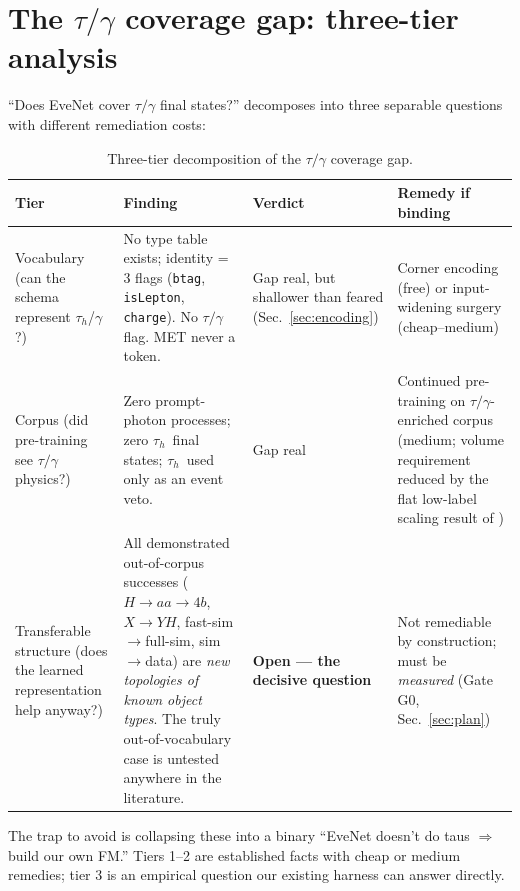 \documentclass[11pt]{article}
\newcommand{\tauh}{\ensuremath{\tau_h}}
\begin{document}
\section{The $\tau/\gamma$ coverage gap: three-tier analysis}
\label{sec:threetier}

``Does EveNet cover $\tau/\gamma$ final states?'' decomposes into three
separable questions with different remediation costs:

\begin{table}[h]
\centering\small
\begin{tabular}{@{}p{3.2cm}p{5.6cm}p{2.2cm}p{3.4cm}@{}}
\toprule
\textbf{Tier} & \textbf{Finding} & \textbf{Verdict} & \textbf{Remedy if binding} \\
\midrule
Vocabulary (can the schema represent \tauh/$\gamma$?) &
No type table exists; identity = 3 flags
(\texttt{btag}, \texttt{isLepton}, \texttt{charge}).
No $\tau/\gamma$ flag. MET never a token. &
Gap real, but shallower than feared (Sec.~\ref{sec:encoding}) &
Corner encoding (free) or input-widening surgery (cheap--medium) \\
\addlinespace
Corpus (did pre-training see $\tau/\gamma$ physics?) &
Zero prompt-photon processes; zero \tauh\ final states;
\tauh\ used only as an event veto. &
Gap real &
Continued pre-training on $\tau/\gamma$-enriched corpus (medium; volume
requirement reduced by the flat low-label scaling result of
\cite{Elsharkawy:2026}) \\
\addlinespace
Transferable structure (does the learned representation help anyway?) &
All demonstrated out-of-corpus successes ($H\to aa\to4b$, $X\to YH$,
fast-sim$\to$full-sim, sim$\to$data) are \emph{new topologies of known
object types}. The truly out-of-vocabulary case is untested anywhere in
the literature. &
\textbf{Open --- the decisive question} &
Not remediable by construction; must be \emph{measured} (Gate G0,
Sec.~\ref{sec:plan}) \\
\bottomrule
\end{tabular}
\caption{Three-tier decomposition of the $\tau/\gamma$ coverage gap.}
\label{tab:tiers}
\end{table}

\noindent
The trap to avoid is collapsing these into a binary ``EveNet doesn't do taus
$\Rightarrow$ build our own FM.'' Tiers 1--2 are established facts with cheap
or medium remedies; tier 3 is an empirical question our existing harness can
answer directly.
\end{document}
